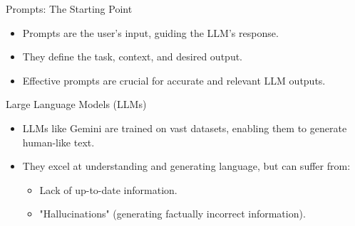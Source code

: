 \documentclass{beamer}
\begin{document}


\begin{frame}{Prompts: The Starting Point}
  \begin{itemize}
    \item Prompts are the user's input, guiding the LLM's response.
    \item They define the task, context, and desired output.
    \item Effective prompts are crucial for accurate and relevant LLM outputs.
  \end{itemize}
\end{frame}

\begin{frame}{Large Language Models (LLMs)}
  \begin{itemize}
    \item LLMs like Gemini are trained on vast datasets, enabling them to generate human-like text.
    \item They excel at understanding and generating language, but can suffer from:
      \begin{itemize}
        \item Lack of up-to-date information.
        \item "Hallucinations" (generating factually incorrect information).
      \end{itemize}
  \end{itemize}
\end{frame}
\end{document}
